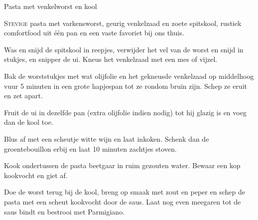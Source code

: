 \begin{recipe}{Pasta met venkelworst en kool}


\lettrine{S}{tevige} pasta met varkensworst, geurig venkelzaad en zoete
spitskool, rustiek comfortfood uit één pan en een vaste favoriet bij ons thuis.

\begin{ingredients}
\end{ingredients}

\begin{steps}
  \item Was en snijd de spitskool in reepjes, verwijder het vel van de worst
        en snijd in stukjes, en snipper de ui. Kneus het venkelzaad met een
        mes of vijzel.
  \item Bak de worststukjes met wat olijfolie en het gekneusde venkelzaad op
        middelhoog vuur 5 minuten in een grote hapjespan tot ze rondom bruin
        zijn. Schep ze eruit en zet apart.
  \item Fruit de ui in dezelfde pan (extra olijfolie indien nodig) tot hij
        glazig is en voeg dan de kool toe.
  \item Blus af met een scheutje witte wijn en laat inkoken. Schenk dan de
        groentebouillon erbij en laat 10 minuten zachtjes stoven.
  \item Kook ondertussen de pasta beetgaar in ruim gezouten water. Bewaar een
        kop kookvocht en giet af.
  \item Doe de worst terug bij de kool, breng op smaak met zout en peper en
        schep de pasta met een scheut kookvocht door de saus. Laat nog even
        meegaren tot de saus bindt en bestrooi met Parmigiano.
\end{steps}
\end{recipe}
